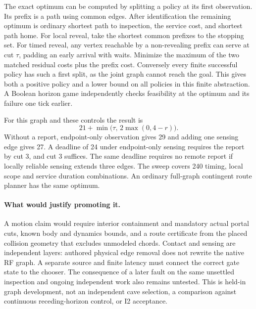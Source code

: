 \documentclass{article}
\begin{document}
The exact optimum can be computed by splitting a policy at its first
observation. Its prefix is a path using common edges. After
identification the remaining optimum is ordinary shortest path to
inspection, the service cost, and shortest path home. For local
reveal, take the shortest common prefixes to the stopping set.
For timed reveal, any vertex reachable by a non-revealing prefix
can serve at cut $\tau$, padding an early arrival with waits.
Minimize the maximum of the two matched residual costs plus the
prefix cost. Conversely every finite successful policy has such a
first split, as the joint graph cannot reach the goal. This gives
both a positive policy and a lower bound on all policies in this
finite abstraction. A Boolean horizon game independently checks
feasibility at the optimum and its failure one tick earlier.

For this graph and these controls the result is
\[
  21 + \min\bigl(\tau,\,2\max(0,4-r)\bigr).
\]
Without a report, endpoint-only observation gives 29 and adding
one sensing edge gives 27. A deadline of 24 under endpoint-only
sensing requires the report by cut 3, and cut 3 suffices. The same
deadline requires no remote report if locally reliable sensing
extends three edges. The sweep covers 240 timing, local scope and
service duration combinations. An ordinary full-graph contingent
route planner has the same optimum.

\paragraph{What would justify promoting it.}
A motion claim would require interior containment and mandatory
actual portal cuts, known body and dynamics bounds, and a route
certificate from the placed collision geometry that excludes
unmodeled chords. Contact and sensing are independent layers:
authored physical edge removal does not rewrite the native RF
graph. A separate source and finite latency must connect the
correct gate state to the chooser. The consequence of a later
fault on the same unsettled inspection and ongoing independent
work also remains untested. This is held-in graph development,
not an independent cave selection, a comparison against continuous
receding-horizon control, or I2 acceptance.
\end{document}
